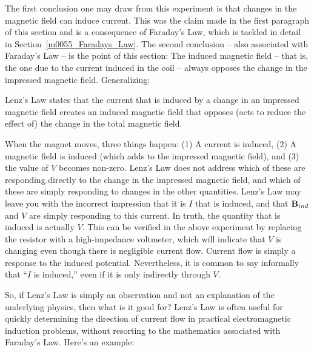 The first conclusion one may draw from this experiment is that changes in the magnetic field can induce current.  
This was the claim made in the first paragraph of this section and is a consequence of Faraday's Law, 
which is tackled in detail in Section~\ref{m0055_Faradays_Law}.
The second conclusion -- also associated with Faraday's Law -- is the point of this section:  The induced magnetic field -- that is, the one due to the current induced in the coil -- always opposes the change in the impressed magnetic field.  Generalizing:
%
\begin{mdframed}[backgroundcolor=yellow!20] 
Lenz's Law states that the current that is induced by a change in an impressed magnetic field creates an induced magnetic field that opposes (acts to reduce the effect of) the change in the total magnetic field.
\end{mdframed}

When the magnet moves, three things happen: (1) A current is induced, (2) A magnetic field is induced (which adds to the impressed magnetic field), and (3) the value of $V$ becomes non-zero.
Lenz's Law does not address which of these are responding directly to the change in the impressed magnetic field, and which of these are simply responding to changes in the other quantities.
Lenz's Law may leave you with the incorrect impression that it is $I$ that is induced, and that ${\bf B}_{ind}$ and $V$ are simply responding to this current.
In truth, the quantity that is induced is actually $V$.  
This can be verified in the above experiment by replacing the resistor with a high-impedance voltmeter, which will indicate that $V$ is changing even though there is negligible current flow.
Current flow is simply a response to the induced potential.
Nevertheless, it is common to say informally that ``$I$ is induced,'' even if it is only indirectly through $V$. 

So, if Lenz's Law is simply an observation and not an explanation of the underlying physics, then what is it good for?
Lenz's Law is often useful for quickly determining the direction of current flow in practical electromagnetic induction problems, without resorting to the mathematics associated with Faraday's Law.
Here's an example:


